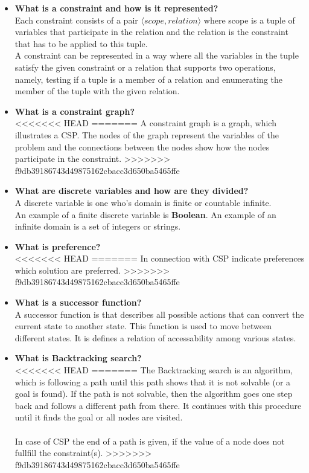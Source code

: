 \documentclass[11pt]{article}
\begin{document}
\begin{itemize}
		\item\textbf{What is a constraint and how is it represented?}\\
		Each constraint consists of a pair $\langle scope, relation \rangle$ where scope is a tuple of variables that participate in the relation and the relation is the constraint that has to be applied to this tuple.\\ A constraint can be represented in a way where all the variables in the tuple satisfy the given constraint or a relation that supports two operations, namely, testing if a tuple is a member of a relation and enumerating the member of the tuple with the given relation.
		
		
		\item\textbf{What is a constraint graph?}\\
<<<<<<< HEAD
=======
		A constraint graph is a graph, which illustrates a CSP. The nodes of the graph represent the variables of the problem and the connections between the nodes show how the nodes participate in the constraint.
>>>>>>> f9db39186743d49875162cbacc3d650ba5465ffe
		
		\item\textbf{What are discrete variables and how are they divided?}\\
		A discrete variable is one who's domain is finite or countable infinite.\\ An example of a finite discrete variable is \textbf{Boolean}. An example of an infinite domain is a set of integers or strings.
		
		\item\textbf{What is preference?}\\
<<<<<<< HEAD
=======
		In connection with CSP indicate preferences which solution are preferred. 
>>>>>>> f9db39186743d49875162cbacc3d650ba5465ffe
		
		\item\textbf{What is a successor function?}\\
		A successor function is that describes all possible actions that can convert the current state to another state. This function is used to move between different states. It is defines a relation of accessability among various states. 
		
		\item\textbf{What is Backtracking search?}\\
<<<<<<< HEAD
=======
		The Backtracking search is an algorithm, which is following a path until this path shows that it is not solvable (or a goal is found). If the path is not solvable, then the algorithm goes one step back and follows a different path from there. It continues with this procedure until it finds the goal or all nodes are visited.\\
		\\
		In case of CSP the end of a path is given, if the value of a node does not fullfill the constraint(s).
>>>>>>> f9db39186743d49875162cbacc3d650ba5465ffe
	\end{itemize}
\end{document}
